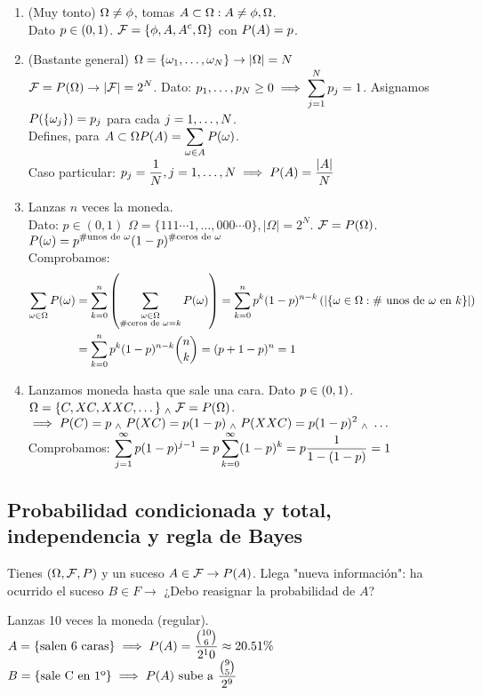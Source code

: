 \begin{enumerate}%
	\item (Muy tonto) $\displaystyle\Omega \ne \phi$, tomas $\displaystyle A \subset \Omega : A\ne \phi, \Omega$. \\
	Dato $\displaystyle p\in (0, 1)$. $\displaystyle\mathcal{F} = \{\phi, A, A^c, \Omega\}$ con $\displaystyle P(A) = p$.
	\item (Bastante general) $\displaystyle\Omega = \{\omega_1, \dots, \omega_N\} \rightarrow |\Omega| = N$ \\
	$\displaystyle\mathcal{F} = P(\Omega) \rightarrow |\mathcal{F}|=2^N$. Dato: $\displaystyle p_1, \dots, p_N \ge 0 \implies \sum_{j=1}^N p_j=1$.
	Asignamos $\displaystyle P(\{\omega_j\})=p_j$ para cada $\displaystyle j=1, \dots, N$.\\
	Defines, para $\displaystyle A\subset \Omega P(A) = \sum_{\omega \in A}P(\omega)$.\\
	Caso particular: $\displaystyle p_j=\frac{1}{N}, j = 1,\dots, N \implies P(A)=\frac{|A|}{N}$
	\item Lanzas $n$ veces la moneda. \\
	Dato: $p \in (0,1)$
	$\Omega = \{111\cdots1, \dots, 000\cdots0\}, |\Omega|=2^N$. $\mathcal{F}=P(\Omega)$. \\
	$\displaystyle P(\omega)= p^{\#\text{unos de }\omega} (1-p)^{\#\text{ceros de }\omega}$ \\
	Comprobamos:
	\begin{equation*}
		\begin{split}
			\displaystyle\sum_{\omega \in \Omega} P(\omega)&=\sum_{k=0}^n \left(\sum_{\substack{\omega\in \Omega \\
			\#\text{ceros de }\omega = k}} P(\omega)\right)=\sum_{k=0}^n p^k (1-p)^{n-k}\left(|\{\omega\in \Omega :\#\text{ unos de } \omega\text{ en }k\}|\right) \\
			&=\sum_{k=0}^np^k(1-p)^{n-k} \binom{n}{k} = (p+1-p)^n=1
		\end{split}
	\end{equation*}
	\item Lanzamos moneda hasta que sale una cara. Dato $\displaystyle p\in (0,1)$. \\
	$\displaystyle \Omega = \{C, XC, XXC, \dots\} \; _{\wedge} \; \mathcal{F}=P(\Omega)$. \\
	$\displaystyle \implies P(C)=p \; _{\wedge} \; P(XC)=p(1-p) \; _{\wedge} \; P(XXC)=p(1-p)^2 \; _{\wedge} \; \dots$ \\
	Comprobamos: $\displaystyle\sum_{j=1}^{\infty} p(1-p)^{j-1} = p\sum_{k=0}^\infty(1-p)^k = p \frac{1}{1-(1-p)} = 1$
\end{enumerate}

\subsection{Probabilidad condicionada y total, independencia y regla de Bayes}
Tienes $(\Omega, \mathcal{F}, P)$ y un suceso $A\in \mathcal{F} \rightarrow P(A)$. Llega "nueva información": ha ocurrido el suceso $B\in F \rightarrow$ ¿Debo reasignar la probabilidad de $A$?
\begin{ejem}
	Lanzas 10 veces la moneda (regular). \\
	$\displaystyle A=\{\text{salen 6 caras}\} \implies P(A)=\frac{\binom{10}{6}}{2^10} \approx 20.51 \%$
	$\displaystyle B=\{\text{sale C en 1º}\} \implies P(A)\text{ sube a }\frac{\binom{9}{5}}{2^9}$
\end{ejem}

